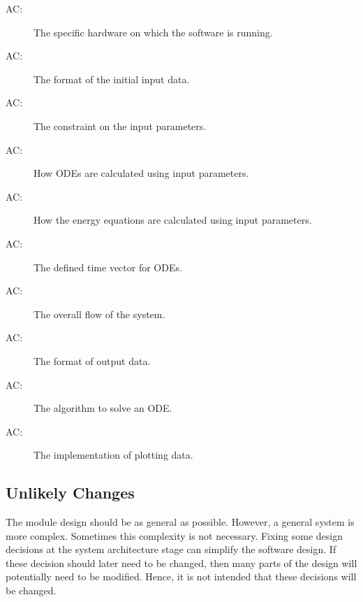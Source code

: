 \documentclass[12pt, titlepage]{article}
\newcounter{acnum}
\newcommand{\actheacnum}{AC\theacnum}
\begin{document}
\begin{description}
\item[ \actheacnum \label{1_ac}:] The specific
  hardware on which the software is running.
\item[ \actheacnum \label{2_ac}:] The format of the initial input data.
\item[ \actheacnum \label{3_ac}:] The constraint on the input parameters. 
\item[ \actheacnum \label{4_ac}:] How ODEs are calculated using input parameters. 
\item[ \actheacnum \label{5_ac}:] How the energy equations are calculated using input parameters. 
\item[ \actheacnum \label{6_ac}:] The defined time vector for ODEs.
\item[ \actheacnum \label{7_ac}:] The overall flow of the system. 
\item[ \actheacnum \label{8_ac}:] The format of output data. 
\item[ \actheacnum \label{9_ac}:] The algorithm to solve an ODE. 
\item[ \actheacnum \label{10_ac}:] The implementation of plotting data. 


\end{description}

\subsection{Unlikely Changes} \label{SecUchange}

The module design should be as general as possible. However, a general system is
more complex. Sometimes this complexity is not necessary. Fixing some design
decisions at the system architecture stage can simplify the software design. If
these decision should later need to be changed, then many parts of the design
will potentially need to be modified. Hence, it is not intended that these
decisions will be changed.
\end{document}
